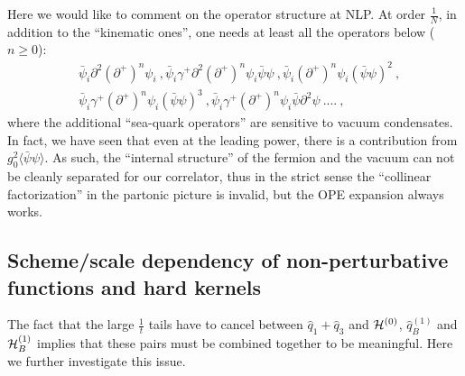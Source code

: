 \documentclass[a4paper,11pt]{article}
\begin{document}
Here we would like to comment on the operator structure at NLP. At order $\frac{1}{N}$, in addition to the ``kinematic ones'', one needs at least all the operators below ($n\ge 0$):
\begin{align}
&\bar \psi_i \partial^2 (\partial^+)^n\psi_i \ ,  
\bar \psi_i \gamma^+ \partial^2 (\partial^+)^n\psi_i \bar\psi \psi \ ,\bar \psi_i (\partial^+)^n\psi_i (\bar \psi \psi)^2 \ , \nonumber \\ 
&\bar \psi_i \gamma^+  (\partial^+)^n\psi_i (\bar \psi \psi)^3 \ , \bar \psi_i \gamma^+(\partial^+)^n\psi_i \bar \psi \partial^2\psi  \ .... \ , 
\end{align}
where the additional ``sea-quark operators'' are sensitive to vacuum condensates. In fact, we have seen that even at the leading power, there is a contribution from $g_0^2\langle \bar \psi \psi\rangle$.  As such, the ``internal structure'' of the fermion and the vacuum can not be cleanly separated for our correlator, thus in the strict sense the ``collinear factorization'' in the partonic picture is invalid, but the OPE expansion always works.




\subsection{Scheme/scale dependency of non-perturbative functions and hard kernels}\label{sec:scalescheme}
The fact that the large $\frac{1}{t}$ tails have to cancel between $\hat q_1+\hat q_3$ and ${\cal H}^{(0)}$, $\hat q^{(1)}_B$ and ${\cal H}^{(1)}_B$ implies that these pairs must be combined together to be meaningful. Here we further investigate this issue. 
\end{document}
